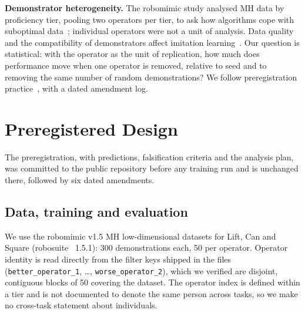 \IfFileExists{IEEEtran.cls}{\documentclass[journal]{IEEEtran}}{\documentclass[10pt,twocolumn]{article}}
\begin{document}
\textbf{Demonstrator heterogeneity.} The robomimic study analysed MH data by proficiency tier, pooling two operators per tier, to ask how algorithms cope with suboptimal data~\cite{mandlekar2021robomimic}; individual operators were not a unit of analysis. Data quality and the compatibility of demonstrators affect imitation learning~\cite{belkhale2023dataquality,gandhi2022compatible}. Our question is statistical: with the operator as the unit of replication, how much does performance move when one operator is removed, relative to seed and to removing the same number of random demonstrations? We follow preregistration practice~\cite{nosek2018prereg}, with a dated amendment log.

\section{Preregistered Design}
\label{sec:design}
The preregistration, with predictions, falsification criteria and the analysis plan, was committed to the public repository before any training run and is unchanged there, followed by six dated amendments.

\subsection{Data, training and evaluation}
We use the robomimic v1.5 MH low-dimensional datasets for Lift, Can and Square (robosuite~\cite{zhu2020robosuite} 1.5.1): 300 demonstrations each, 50 per operator. Operator identity is read directly from the filter keys shipped in the files (\texttt{better\_operator\_1}, \dots, \texttt{worse\_operator\_2}), which we verified are disjoint, contiguous blocks of 50 covering the dataset. The operator index is defined within a tier and is not documented to denote the same person across tasks, so we make no cross-task statement about individuals.
\end{document}
